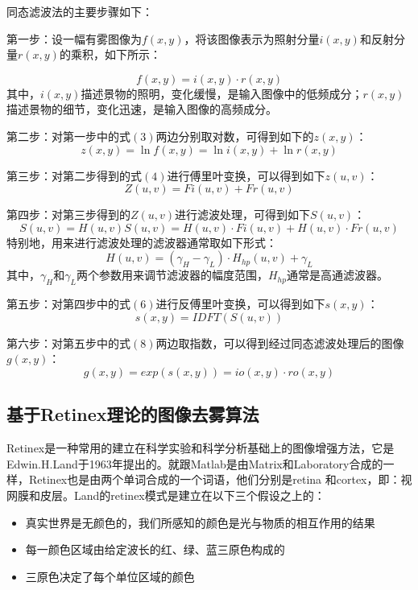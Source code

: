 \documentclass[12pt]{article}
\begin{document}
同态滤波法的主要步骤如下：

第一步：设一幅有雾图像为$f(x,y)$，将该图像表示为照射分量$i(x,y)$和反射分量$r(x,y)$的乘积，如下所示：

\begin{equation}
    f(x,y)=i(x,y)·r(x,y)
\end{equation}
其中，$i(x,y)$描述景物的照明，变化缓慢，是输入图像中的低频成分；$r(x,y)$描述景物的细节，变化迅速，是输入图像的高频成分。

第二步：对第一步中的式$(3)$两边分别取对数，可得到如下的$z(x,y)$：
\begin{equation}
    z(x,y)=\ln f(x,y) =\ln i(x,y) +\ln r(x,y)
\end{equation}

第三步：对第二步得到的式$(4)$进行傅里叶变换，可以得到如下$z(u,v)$：
\begin{equation}
    Z(u,v)=Fi(u,v) +Fr(u,v)
\end{equation}

第四步：对第三步得到的$Z(u,v)$进行滤波处理，可得到如下$S(u,v)$：
\begin{equation}
    S(u,v)=H(u,v)S(u,v)=H(u,v)·Fi(u,v) +H(u,v)·Fr(u,v)
\end{equation}
特别地，用来进行滤波处理的滤波器通常取如下形式：
\begin{equation}
    H(u,v)=(\gamma_H -\gamma_L)·H_{hp}(u,v)+\gamma_L
\end{equation}
其中，$\gamma_H$和$\gamma_L$两个参数用来调节滤波器的幅度范围，$H_{hp}$通常是高通滤波器。

第五步：对第四步中的式$(6)$进行反傅里叶变换，可以得到如下$s(x,y)$：
\begin{equation}
    s(x,y)=IDFT(S(u,v))
\end{equation}

第六步：对第五步中的式$(8)$两边取指数，可以得到经过同态滤波处理后的图像$g(x,y)$：
\begin{equation}
    g(x,y)=exp(s(x,y))=io(x,y)·ro(x,y)
\end{equation}

\subsection{基于Retinex理论的图像去雾算法}
Retinex是一种常用的建立在科学实验和科学分析基础上的图像增强方法，它是Edwin.H.Land于1963年提出的。就跟Matlab是由Matrix和Laboratory合成的一样，Retinex也是由两个单词合成的一个词语，他们分别是retina 和cortex，即：视网膜和皮层。Land的retinex模式是建立在以下三个假设之上的：
\begin{itemize}
    \item 真实世界是无颜色的，我们所感知的颜色是光与物质的相互作用的结果
    \item 每一颜色区域由给定波长的红、绿、蓝三原色构成的
    \item 三原色决定了每个单位区域的颜色
\end{itemize}
\end{document}
